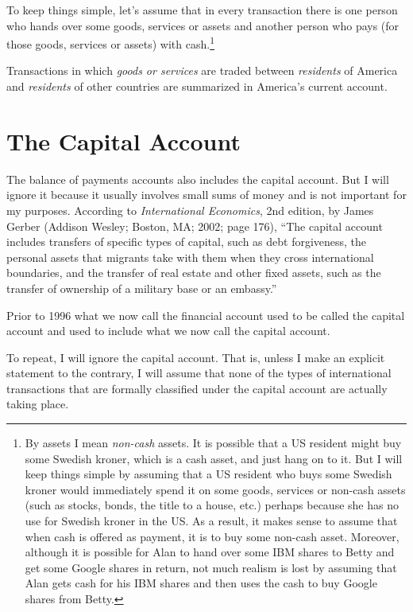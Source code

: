 \documentclass[
  letterpaper,
]{book}
\begin{document}
To keep things simple, let's assume that in every transaction there is
one person who hands over some goods, services or assets and another
person who pays (for those goods, services or assets) with
cash.\footnote{By assets I mean \emph{non-cash} assets. It is possible
  that a US resident might buy some Swedish kroner, which is a cash
  asset, and just hang on to it. But I will keep things simple by
  assuming that a US resident who buys some Swedish kroner would
  immediately spend it on some goods, services or non-cash assets (such
  as stocks, bonds, the title to a house, etc.) perhaps because she has
  no use for Swedish kroner in the US. As a result, it makes sense to
  assume that when cash is offered as payment, it is to buy some
  non-cash asset. Moreover, although it is possible for Alan to hand
  over some IBM shares to Betty and get some Google shares in return,
  not much realism is lost by assuming that Alan gets cash for his IBM
  shares and then uses the cash to buy Google shares from Betty.}

Transactions in which \emph{goods or services} are traded between
\emph{residents} of America and \emph{residents} of other countries are
summarized in America's current
account.

\section{The Capital Account}\label{sec-capacc}

The balance of payments accounts also includes the capital
account. But I will ignore it
because it usually involves small sums of money and is not important for
my purposes. According to \emph{International Economics}, 2nd edition,
by James Gerber (Addison Wesley; Boston, MA; 2002; page 176), ``The
capital account includes transfers of specific types of capital, such as
debt forgiveness, the personal assets that migrants take with them when
they cross international boundaries, and the transfer of real estate and
other fixed assets, such as the transfer of ownership of a military base
or an embassy.''

Prior to 1996 what we now call the financial account used to be called
the capital account and used to include what we now call the capital
account.

To repeat, I will ignore the capital account. That is, unless I make an
explicit statement to the contrary, I will assume that none of the types
of international transactions that are formally classified under the
capital account are actually taking place.
\end{document}
